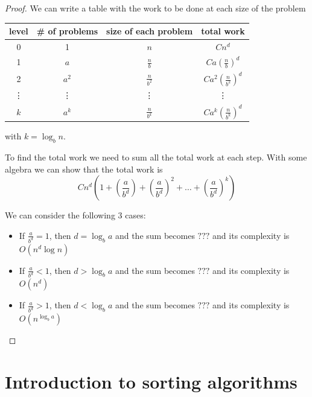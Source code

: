 \documentclass[12pt]{extarticle}
\begin{document}
\begin{proof}
    We can write a table with the work to be done at each size of the problem

    \begin{center}
        \begin{tabular}{ |c|c|c|c| }
            \hline
            level  & \# of problems & size of each problem & total work                         \\
            \hline
            0      & 1              & $n$                  & $Cn^d$                             \\
            1      & $a$            & $\frac{n}{b}$        & $Ca\left(\frac{n}{b}\right)^d$     \\
            2      & $a^2$          & $\frac{n}{b^2}$      & $Ca^2\left(\frac{n}{b^2}\right)^d$ \\
            \vdots & \vdots         & \vdots               & \vdots                             \\
            $k$    & $a^k$          & $\frac{n}{b^k}$      & $Ca^k\left(\frac{n}{b^k}\right)^d$ \\
            \hline
        \end{tabular}
    \end{center}

    with $k = \log_b n$.

    To find the total work we need to sum all the total work at each step.
    With some algebra we can show that the total work is
    $$
        Cn^d\left(1+\left(\frac{a}{b^d}\right)+\left(\frac{a}{b^d}\right)^2+\dots+\left(\frac{a}{b^d}\right)^k\right)
    $$

    We can consider the following 3 cases:
    \begin{itemize}
        \item If $\frac{a}{b^d} = 1$, then $d = \log_b a$ and the sum becomes $ ??? $ and its complexity is $O(n^d \log n)$
        \item If $\frac{a}{b^d} < 1$, then $d > \log_b a$ and the sum becomes $ ??? $ and its complexity is $O(n^d)$
        \item If $\frac{a}{b^d} > 1$, then $d < \log_b a$ and the sum becomes $ ??? $ and its complexity is $O(n^{\log_b a})$
    \end{itemize}

\end{proof}

\section{Introduction to sorting algorithms}
\end{document}

